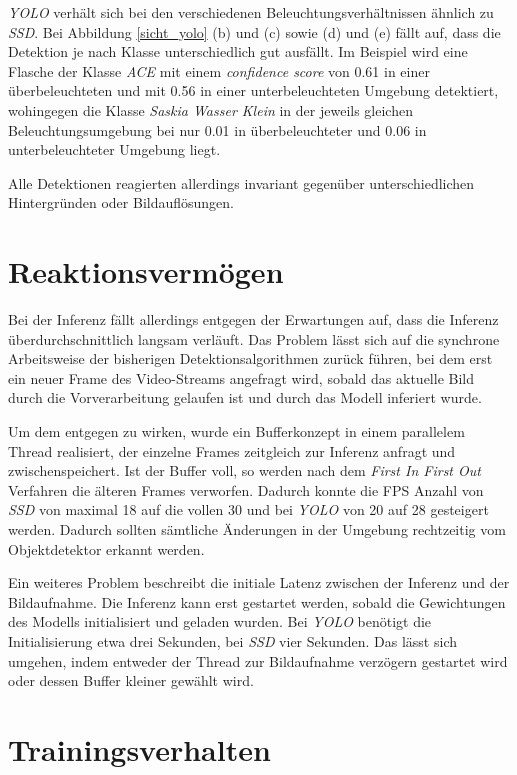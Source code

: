 \textit{YOLO} verhält sich bei den verschiedenen Beleuchtungsverhältnissen ähnlich zu \textit{SSD}. Bei Abbildung \ref{sicht_yolo} (b) und (c) sowie (d) und (e) fällt auf, dass die Detektion je nach Klasse unterschiedlich gut ausfällt. Im Beispiel wird eine Flasche der Klasse \textit{ACE} mit einem \textit{confidence score} von 0.61 in einer überbeleuchteten und mit 0.56 in einer unterbeleuchteten Umgebung detektiert, wohingegen die Klasse \textit{Saskia Wasser Klein} in der jeweils gleichen Beleuchtungsumgebung bei nur 0.01 in überbeleuchteter und 0.06 in unterbeleuchteter Umgebung liegt.

Alle Detektionen reagierten allerdings invariant gegenüber unterschiedlichen Hintergründen oder Bildauflösungen.
 
\section{Reaktionsvermögen}

Bei der Inferenz fällt allerdings entgegen der Erwartungen auf, dass die Inferenz überdurchschnittlich langsam verläuft. Das Problem lässt sich auf die synchrone Arbeitsweise der bisherigen Detektionsalgorithmen zurück führen, bei dem erst ein neuer Frame des Video-Streams angefragt wird, sobald das aktuelle Bild durch die Vorverarbeitung gelaufen ist und durch das Modell inferiert wurde. 

Um dem entgegen zu wirken, wurde ein Bufferkonzept in einem parallelem Thread realisiert, der einzelne Frames zeitgleich zur Inferenz anfragt und zwischenspeichert. Ist der Buffer voll, so werden nach dem \textit{First In First Out} Verfahren die älteren Frames verworfen. Dadurch konnte die FPS Anzahl von \textit{SSD} von maximal 18 auf die vollen 30 und bei \textit{YOLO} von 20 auf 28 gesteigert werden. Dadurch sollten sämtliche Änderungen in der Umgebung rechtzeitig vom Objektdetektor erkannt werden. 

Ein weiteres Problem beschreibt die initiale Latenz zwischen der Inferenz und der Bildaufnahme. Die Inferenz kann erst gestartet werden, sobald die Gewichtungen des Modells initialisiert und geladen wurden. Bei \textit{YOLO} benötigt die Initialisierung etwa drei Sekunden, bei \textit{SSD} vier Sekunden. Das lässt sich umgehen, indem entweder der Thread zur Bildaufnahme verzögern gestartet wird oder dessen Buffer kleiner gewählt wird.

\section{Trainingsverhalten}

